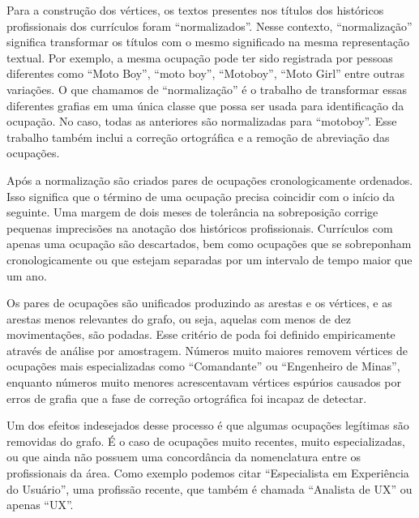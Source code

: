 \documentclass[12pt,a4paper]{article}
\theoremstyle{hypo}
\begin{document}
Para a construção dos vértices, os textos presentes nos títulos dos históricos profissionais dos currículos foram \enquote{normalizados}. Nesse contexto, \enquote{normalização} significa transformar os títulos com o mesmo significado na mesma representação textual. Por exemplo, a mesma ocupação pode ter sido registrada por pessoas diferentes como \enquote{Moto Boy}, \enquote{moto boy}, \enquote{Motoboy}, \enquote{Moto Girl} entre outras variações. O que chamamos de \enquote{normalização} é o trabalho de transformar essas diferentes grafias em uma única classe que possa ser usada para identificação da ocupação. No caso, todas as anteriores são normalizadas para \enquote{motoboy}. Esse trabalho também inclui a correção ortográfica e a remoção de abreviação das ocupações.

Após a normalização são criados pares de ocupações cronologicamente ordenados. Isso significa que o término de uma ocupação precisa coincidir com o início da seguinte. Uma margem de dois meses de tolerância na sobreposição corrige pequenas imprecisões na anotação dos históricos profissionais. Currículos com apenas uma ocupação são descartados, bem como ocupações que se sobreponham cronologicamente ou que estejam separadas por um intervalo de tempo maior que um ano.

Os pares de ocupações são unificados produzindo as arestas e os vértices, e as arestas menos relevantes do grafo, ou seja, aquelas com menos de dez movimentações, são podadas. Esse critério de poda foi definido empiricamente através de análise por amostragem. Números muito maiores removem vértices de ocupações mais especializadas como \enquote{Comandante} ou \enquote{Engenheiro de Minas}, enquanto números muito menores acrescentavam vértices espúrios causados por erros de grafia que a fase de correção ortográfica foi incapaz de detectar.

Um dos efeitos indesejados desse processo é que algumas ocupações legítimas são removidas do grafo. É o caso de ocupações muito recentes, muito especializadas, ou que ainda não possuem uma concordância da nomenclatura entre os profissionais da área. Como exemplo podemos citar \enquote{Especialista em Experiência do Usuário}, uma profissão recente, que também é chamada \enquote{Analista de UX} ou apenas \enquote{UX}.

\end{document}
